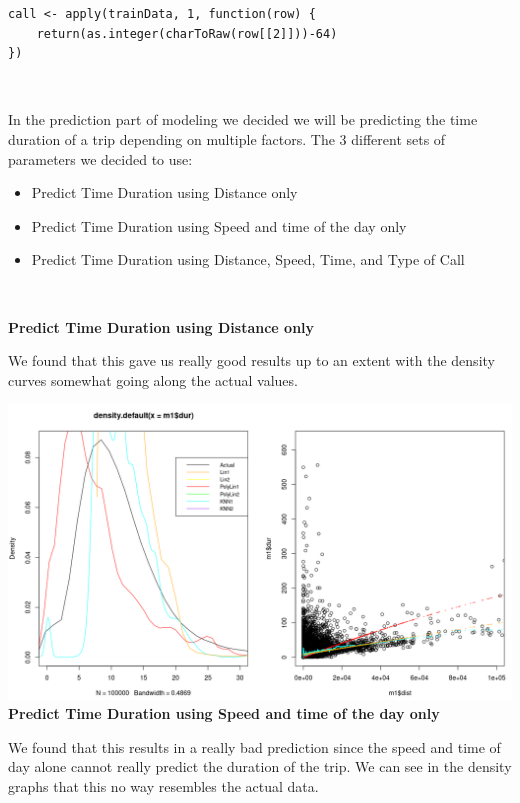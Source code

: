 \documentclass[11pt]{article}
\begin{document}
\begin{lstlisting}
call <- apply(trainData, 1, function(row) {
	return(as.integer(charToRaw(row[[2]]))-64)
})
\end{lstlisting}

\\
\par
In the prediction part of modeling we decided we will be predicting the time duration of a trip depending on multiple factors. The 3 different sets of parameters we decided to use:
\begin{itemize}
	\item Predict Time Duration using Distance only
	\item Predict Time Duration using Speed and time of the day only
	\item Predict Time Duration using Distance, Speed, Time, and Type of Call
\end{itemize}

\\
\par
\textbf{Predict Time Duration using Distance only}
\par
We found that this gave us really good results up to an extent with the density curves somewhat going along the actual values.

\noindent\includegraphics[scale = .40]{dist_pred.png}\\

\textbf{Predict Time Duration using Speed and time of the day only}
\par
We found that this results in a really bad prediction since the speed and time of day alone cannot really predict the duration of the trip. We can see in the density graphs that this no way resembles the actual data.
\end{document}
